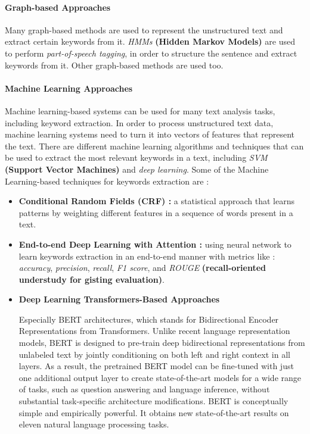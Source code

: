 \paragraph{Graph-based Approaches}
Many graph-based methods are used to represent the unstructured text and extract certain keywords from it. \emph{HMMs} \textbf{(Hidden Markov Models)} are used to perform \emph{part-of-speech tagging}, in order to structure the sentence and extract keywords from it. Other graph-based methods are used too.

\paragraph{Machine Learning Approaches}
Machine learning-based systems can be used for many text analysis tasks, including keyword extraction. In order to process unstructured text data, machine learning systems need to turn it into vectors of features that represent the text. There are different machine learning algorithms and techniques that can be used to extract the most relevant keywords in a text, including \emph{SVM} \textbf{(Support Vector Machines)} and \emph{deep learning}. Some of the Machine Learning-based techniques for keywords extraction are :
\begin{itemize}
    \item \textbf{Conditional Random Fields (CRF) :} a statistical approach that learns patterns by weighting different features in a sequence of words present in a text.
    \item \textbf{End-to-end Deep Learning with Attention :} using neural network to learn keywords extraction in an end-to-end manner with metrics like : \emph{accuracy}, \emph{precision}, \emph{recall}, \emph{F1 score}, and \emph{ROUGE} \textbf{(recall-oriented understudy for gisting evaluation)}.
    
    \item \textbf{Deep Learning Transformers-Based Approaches}
    
    Especially BERT architectures, which stands for Bidirectional Encoder Representations from Transformers. Unlike recent language representation models, BERT is designed to pre-train deep bidirectional representations from unlabeled text by jointly conditioning on both left and right context in all layers. As a result, the pretrained BERT model can be fine-tuned with just one additional output layer to create state-of-the-art models for a wide range of tasks, such as question answering and language inference, without substantial task-specific architecture modifications.
    BERT is conceptually simple and empirically powerful. It obtains new state-of-the-art results on eleven natural language processing tasks.
    
\end{itemize}

